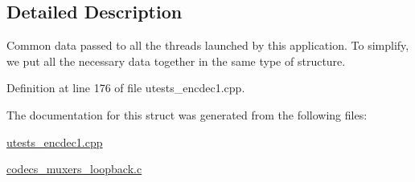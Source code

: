 \subsection{Detailed Description}
Common data passed to all the threads launched by this application. To simplify, we put all the necessary data together in the same type of structure. 

Definition at line 176 of file utests\+\_\+encdec1.\+cpp.



The documentation for this struct was generated from the following files\+:\begin{DoxyCompactItemize}
\item 
\hyperlink{utests__encdec1_8cpp}{utests\+\_\+encdec1.\+cpp}\item 
\hyperlink{codecs__muxers__loopback_8c}{codecs\+\_\+muxers\+\_\+loopback.\+c}\end{DoxyCompactItemize}
